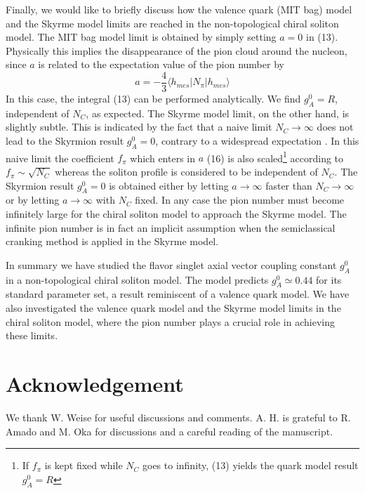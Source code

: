 Finally, we would like to briefly discuss how the valence
quark (MIT bag) model and
the Skyrme model limits are reached  in the 
non-topological chiral soliton model. The
MIT bag model limit is obtained by simply setting $a=0$ in (13).
Physically this implies the disappearance  of the pion  cloud  around
the  nucleon, since
$a$ is related to the expectation value of the pion number by \cite{BG}
\begin{equation}
  a=-\frac{4}{3} \langle h_{mes} \vert N_\pi \vert h_{mes}
         \rangle
\end{equation}
In this case, the integral  (13) can be
performed  analytically.   We find  $g_A^0  = R$, independent  of
$N_C$, as expected. The Skyrme model limit, on the other hand, is
slightly  subtle.   This  is indicated   by the fact that a naive
limit      $N_C \to \infty$ does not lead to the Skyrmion  result
$g_A^0 = 0$, contrary to a widespread  expectation  \cite{BEK,M}.
In  this  naive  limit       
the coefficient $f_\pi$ which enters in $a$ (16) is also scaled\footnote{If
$f_\pi$ is kept fixed while $N_C$ goes to infinity, (13) yields the 
quark model result $g^0_A = R$}
according to $f_\pi \sim \sqrt{N_C}$ whereas the soliton profile
is considered to be independent of $N_C$. The Skyrmion result
 $g_A^0 = 0$ is obtained
either by letting $a \to \infty$  faster than $N_C \to \infty$ or
by letting $a \to \infty$ with $N_C$ fixed.  In any case the pion
number  must become  infinitely large  for the chiral  
soliton  model  to
approach  the  Skyrme  model.   The infinite  pion  number  is
in fact an implicit  assumption  when the semiclassical  cranking
method is applied in the Skyrme model.

In summary we have studied the flavor singlet axial vector coupling
constant $g_A^0$ in a non-topological chiral soliton model.  The model
predicts $g_A^0 \simeq 0.44$ for its standard parameter set, a result 
reminiscent of a valence quark model.  We have also investigated the
valence quark model and the Skyrme model limits in
the chiral soliton model, where the pion number plays a crucial role in
achieving  these limits.

\section*{Acknowledgement}
We thank W. Weise for useful discussions and comments. A. H. is grateful to
R. Amado and M. Oka for discussions and a careful reading of the manuscript.
 

